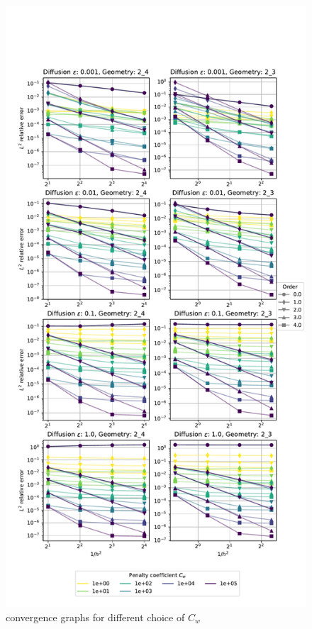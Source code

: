 \begin{figure}[p!]
	\centering
	\includegraphics[height=\textheight]{../figs/parametric/advdiff_2D/quarteroni1}
	\caption{ convergence graphs for different choice of $C_w$}
	\label{fig:qconv1}
\end{figure}
